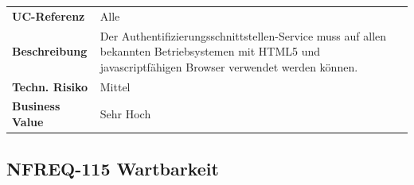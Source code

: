 \begin{longtable}[c]{@{}ll@{}}
\toprule
\begin{minipage}[t]{0.20\columnwidth}\raggedright\strut
\textbf{UC-Referenz}
\strut\end{minipage} &
\begin{minipage}[t]{0.74\columnwidth}\raggedright\strut
Alle
\strut\end{minipage}\tabularnewline
\begin{minipage}[t]{0.20\columnwidth}\raggedright\strut
\textbf{Beschreibung}
\strut\end{minipage} &
\begin{minipage}[t]{0.74\columnwidth}\raggedright\strut
Der Authentifizierungsschnittstellen-Service muss auf allen bekannten
Betriebsystemen mit HTML5 und javascriptfähigen Browser verwendet werden
können.
\strut\end{minipage}\tabularnewline
\begin{minipage}[t]{0.20\columnwidth}\raggedright\strut
\textbf{Techn. Risiko}
\strut\end{minipage} &
\begin{minipage}[t]{0.74\columnwidth}\raggedright\strut
Mittel
\strut\end{minipage}\tabularnewline
\begin{minipage}[t]{0.20\columnwidth}\raggedright\strut
\textbf{Business Value}
\strut\end{minipage} &
\begin{minipage}[t]{0.74\columnwidth}\raggedright\strut
Sehr Hoch
\strut\end{minipage}\tabularnewline
\bottomrule
\end{longtable}

\subsection{NFREQ-115 Wartbarkeit}\label{nfreq-115-wartbarkeit}


